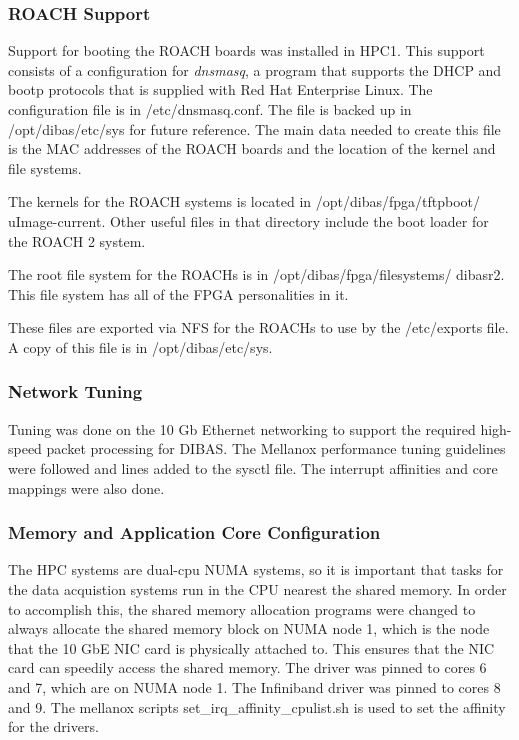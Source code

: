 \documentclass[11pt]{article}
\begin{document}
\subsubsection{ROACH Support}
Support for booting the ROACH boards was installed in HPC1.  This
support consists of a configuration for \emph{dnsmasq}, a program that
supports the DHCP and bootp protocols that is supplied with Red Hat
Enterprise Linux.  The configuration file is in /etc/dnsmasq.conf.
The file is backed up in /opt/dibas/etc/sys for future reference.  The
main data needed to create this file is the MAC addresses of the ROACH
boards and the location of the kernel and file systems.

The kernels for the ROACH systems is located in
/opt/dibas/fpga/tftpboot/ uImage-current.  Other useful files in that
directory include the boot loader for the ROACH 2 system.

The root file system for the ROACHs is in /opt/dibas/fpga/filesystems/
dibasr2.  This file system has all of the FPGA personalities in it.

These files are exported via NFS for the ROACHs to use by the
/etc/exports file.  A copy of this file is in /opt/dibas/etc/sys.

\subsubsection{Network Tuning}
Tuning was done on the 10 Gb Ethernet networking to support the
required high-speed packet processing for DIBAS.  The Mellanox
performance tuning guidelines were followed and lines added to the
sysctl file.  The interrupt affinities and core mappings were also
done.

\subsubsection{Memory and Application Core Configuration}
The HPC systems are dual-cpu NUMA systems, so it is important that
tasks for the data acquistion systems run in the CPU nearest the
shared memory.  In order to accomplish this, the shared memory
allocation programs were changed to always allocate the shared memory
block on NUMA node 1, which is the node that the 10 GbE NIC card is physically 
attached to.  This ensures that the NIC card can speedily access the
shared memory.  The driver was pinned to cores 6 and 7, which are on
NUMA node 1.  The Infiniband driver was pinned to cores 8 and 9.  The
mellanox scripts set\_irq\_affinity\_cpulist.sh is used to set the
affinity for the drivers.
\end{document}
